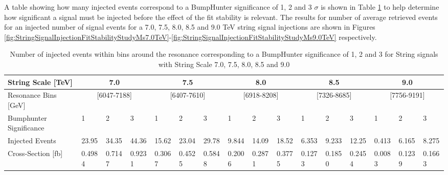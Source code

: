 A table showing how many injected events correspond to a BumpHunter significance of 1, 2 and 3 $\sigma$ is shown in Table \ref{tab:BHSignifcanceStringInjection} to help determine how significant a signal must be injected before the effect of the fit stability is relevant. The results for number of average retrieved events for an injected number of signal events  for a 7.0, 7.5, 8.0, 8.5 and 9.0 TeV string signal injections are shown in Figures \ref{fig:StringSignalInjectionFitStabilityStudyMs7.0TeV}-\ref{fig:StringSignalInjectionFitStabilityStudyMs9.0TeV} respectively. 

\begin{table}[]
    \tiny
    \begin{center}
        \begin{tabular}{l|lll|lll|lll|lll|lll|}
            \toprule
            \midrule
            String Scale {[}TeV{]}   & \multicolumn{3}{c|}{7.0}             & \multicolumn{3}{c|}{7.5}             &
\multicolumn{3}{c|}{8.0}             & \multicolumn{3}{c|}{8.5}             & \multicolumn{3}{c|}{9.0}             \\
            \midrule
            Resonance Bins {[}GeV{]} & \multicolumn{3}{c|}{{[}6047-7188{]}} & \multicolumn{3}{c|}{{[}6407-7610{]}} & \multicolumn{3}{c|}{{[}6918-8208{]}} & \multicolumn{3}{c|}{{[}7326-8685{]}} & \multicolumn{3}{c|}{{[}7756-9191{]}} \\
            Bumphunter Significance  & 1          & 2          & 3          & 1          & 2          & 3          & 1          & 2          & 3          & 1          & 2          & 3          & 1          & 2          & 3          \\
            Injected Events          & 23.95      & 34.35      & 44.36      & 15.62      & 23.04      & 29.78      & 9.844      & 14.09      & 18.52      & 6.353      & 9.233      & 12.25      & 0.413      & 6.165      & 8.275      \\
            Cross-Section {[}fb{]}   & 0.4984     & 0.7147     & 0.9231     & 0.3067     & 0.4525     & 0.5848     & 0.2006     & 0.2871     & 0.3775     & 0.1273     & 0.1850     & 0.2454     & 0.0083     & 0.1239     & 0.1663 \\
            \midrule
            \bottomrule
            \end{tabular}
        \end{center}
    \caption{Number of injected events within bins around the resonance corresponding to a BumpHunter significance of 1, 2 and 3 for String signals with String Scale 7.0, 7.5, 8.0, 8.5 and 9.0}
    \label{tab:BHSignifcanceStringInjection}
\end{table}
